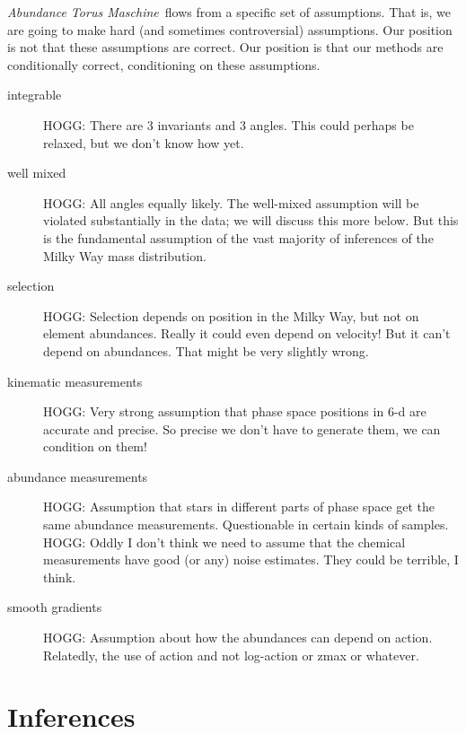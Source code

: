 \documentclass[modern]{aastex63}
\newcommand{\methodname}{\textsl{Abundance Torus Maschine}}
\newcommand{\methodname}{\textsl{Torus--Tangents Topography}}
\begin{document}
\methodname\ flows from a specific set of assumptions.
That is, we are going to make hard (and sometimes controversial) assumptions.
Our position is not that these assumptions are correct.
Our position is that our
methods are conditionally correct, conditioning on these assumptions.
\begin{description}
\item[integrable] HOGG: There are 3 invariants and 3 angles. This could perhaps be
  relaxed, but we don't know how yet.

\item[well mixed] HOGG: All angles equally likely.
  The well-mixed assumption will be violated substantially in the data;
  we will discuss this more below. But this is the fundamental assumption of
  the vast majority of inferences of the Milky Way mass distribution.

\item[selection] HOGG: Selection depends on position in the Milky Way, but not
  on element abundances. Really it could even depend on velocity! But it can't depend
  on abundances. That might be very slightly wrong.

\item[kinematic measurements] HOGG: Very strong assumption that phase space positions
  in 6-d are accurate and precise. So precise we don't have to generate them, we can
  condition on them!

\item[abundance measurements] HOGG: Assumption that stars in different parts of phase
  space get the same abundance measurements. Questionable in certain kinds of samples.
  HOGG: Oddly I don't think we need to assume that the chemical measurements have good
  (or any) noise estimates. They could be terrible, I think.

\item[smooth gradients] HOGG: Assumption about how the abundances can
  depend on action. Relatedly, the use of action and not log-action
  or zmax or whatever.
\end{description}

\section{Inferences}
\end{document}
